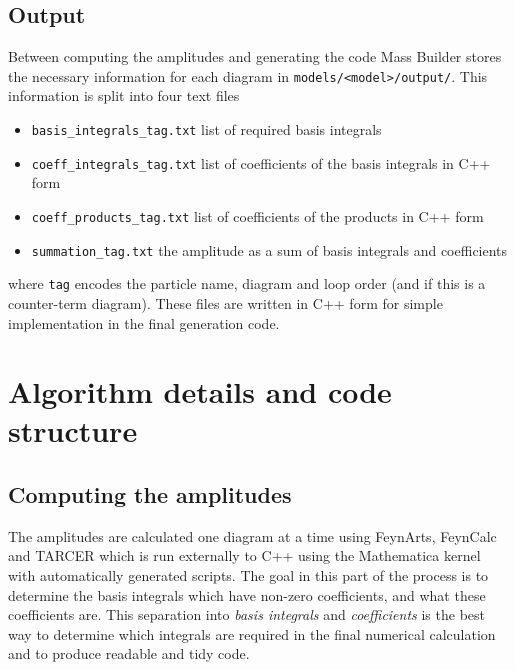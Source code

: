 \subsection{Output}

Between computing the amplitudes and generating the code Mass Builder stores the necessary information for each diagram in \lstinline{models/<model>/output/}.  This information is split into four text files
\begin{itemize}
\item \lstinline{basis_integrals_tag.txt} list of required basis integrals
\item \lstinline{coeff_integrals_tag.txt} list of coefficients of the basis integrals in C++ form
\item \lstinline{coeff_products_tag.txt} list of coefficients of the products in C++ form
\item \lstinline{summation_tag.txt} the amplitude as a sum of basis integrals and coefficients
\end{itemize}
where \lstinline{tag} encodes the particle name, diagram and loop order (and if this is a counter-term diagram).  These files are written in C++ form for simple implementation in the final generation code.



\section{Algorithm details and code structure}


\subsection{Computing the amplitudes}\label{sec:amplitudes}

The amplitudes are calculated one diagram at a time using FeynArts, FeynCalc and TARCER which is run externally to C++ using the Mathematica kernel with automatically generated scripts.  The goal in this part of the process is to determine the basis integrals which have non-zero coefficients, and what these coefficients are.  This separation into \textit{basis integrals} and \textit{coefficients} is the best way to determine which integrals are required in the final numerical calculation and to produce readable and tidy code.


